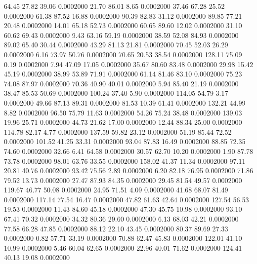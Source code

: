   64.45   27.82   39.06   0.0002000
  21.70   86.01    8.65   0.0002000
  37.46   67.28   25.52   0.0002000
  61.38   87.52   16.88   0.0002000
  90.39   82.83   31.12   0.0002000
  89.85   77.21   20.48   0.0002000
  14.01   65.18   52.73   0.0002000
  60.65   89.60   12.02   0.0002000
  31.10   60.62   69.43   0.0002000
   9.43   63.16   59.19   0.0002000
  38.59   52.08   84.93   0.0002000
  89.02   65.40   30.44   0.0002000
  43.29   81.13   21.81   0.0002000
  70.45   52.03   26.29   0.0002000
   6.16   73.97   50.76   0.0002000
  70.65   20.53   38.54   0.0002000
 128.11   75.09    0.19   0.0002000
   7.94   47.09   17.05   0.0002000
  35.67   80.60   83.48   0.0002000
  29.98   15.42   45.19   0.0002000
  38.99   53.89   71.91   0.0002000
  61.14   81.46   83.10   0.0002000
  75.23   74.08   87.97   0.0002000
  70.36   40.90   40.01   0.0002000
   5.94   85.40   21.19   0.0002000
  38.47   85.53   50.69   0.0002000
 100.24   37.40    5.90   0.0002000
 114.05   54.79    3.17   0.0002000
  49.66   87.13   89.31   0.0002000
  81.53   10.39   61.41   0.0002000
 132.21   44.99    8.82   0.0002000
  96.50   75.79   11.63   0.0002000
  54.26   75.24   38.48   0.0002000
 139.03   19.96   25.71   0.0002000
  44.73   21.62   17.00   0.0002000
  12.44   88.34   25.00   0.0002000
 114.78   82.17    4.77   0.0002000
 137.59   59.82   23.12   0.0002000
  51.19   85.44   72.52   0.0002000
 101.52   41.25   33.31   0.0002000
  93.04   87.83   16.49   0.0002000
  88.85   72.35   74.60   0.0002000
  32.66    6.41   64.58   0.0002000
  30.57   62.70   10.20   0.0002000
   1.90   87.78   73.78   0.0002000
  98.01   63.76   33.55   0.0002000
 158.02   41.37   11.34   0.0002000
  97.11   20.81   40.76   0.0002000
  93.42   75.56    2.89   0.0002000
   6.20   82.18   76.95   0.0002000
  71.86   79.52   13.73   0.0002000
  27.47   87.93   84.35   0.0002000
  29.45   81.54   49.57   0.0002000
 119.67   46.77   50.08   0.0002000
  24.95   71.51    4.09   0.0002000
  41.68   68.07   81.49   0.0002000
 117.14   77.54   16.47   0.0002000
  47.82   61.63   42.64   0.0002000
 127.54   56.53   19.53   0.0002000
  11.43   84.60   45.18   0.0002000
  47.30   45.75   10.98   0.0002000
  93.10   67.41   70.32   0.0002000
  34.32   80.36   29.60   0.0002000
   6.13   68.03   42.21   0.0002000
  77.58   66.28   47.85   0.0002000
  88.12   22.10   43.45   0.0002000
  80.37   89.69   27.33   0.0002000
   0.82   57.71   33.19   0.0002000
  70.88   62.47   45.83   0.0002000
 122.01   41.10   10.99   0.0002000
   5.46   60.04   62.65   0.0002000
  22.96   40.01   71.62   0.0002000
 124.41   40.13   19.08   0.0002000
